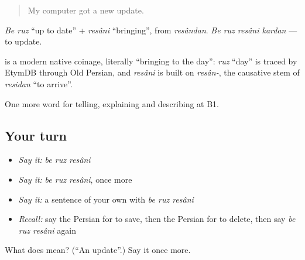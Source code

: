 \begin{quote}
My computer got a new update.
\end{quote}

\emph{Be ruz} \textquotedblleft{}up to date\textquotedblright{} + \emph{resâni} \textquotedblleft{}bringing\textquotedblright{}, from \emph{resândan}. \emph{Be ruz resâni kardan} — to update.

\begin{cousinweb}
\textbf{  } is a modern native coinage, literally \textquotedblleft{}bringing to the day\textquotedblright{}: \emph{ruz} \textquotedblleft{}day\textquotedblright{} is traced by EtymDB through Old Persian, and \emph{resâni} is built on \emph{resân-}, the causative stem of \emph{residan} \textquotedblleft{}to arrive\textquotedblright{}.
\end{cousinweb}

\begin{grammarlens}[title={What you've built}]
One more word for telling, explaining and describing at B1.
\end{grammarlens}

\subsection*{Your turn}
\begin{itemize}
\raggedright
  \item \emph{Say it:} \emph{be ruz resâni}
  \item \emph{Say it:} \emph{be ruz resâni}, once more
  \item \emph{Say it:} a sentence of your own with \emph{be ruz resâni}
  \item \emph{Recall:} say the Persian for to save, then the Persian for to delete, then say \emph{be ruz resâni} again
\end{itemize}

\begin{tcolorbox}[breakable,colback=teal!4,colframe=teal!35!black,title={Before you move on}]
What does    mean? (\textquotedblleft{}An update\textquotedblright{}.) Say it once more.
\end{tcolorbox}

